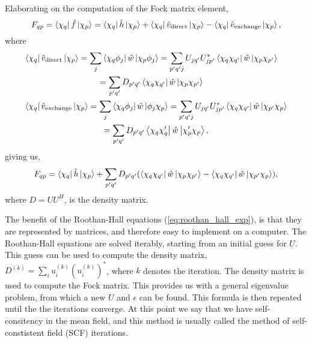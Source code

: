 Elaborating on the computation of the Fock matrix element,
\begin{equation}
    F_{qp} = \bra{\chi_q} \hat{f} \ket{\chi_p}
        = \bra{\chi_q} \hat{h} \ket{\chi_p} 
        + \bra{\chi_q} \hat{v}_{\text{direct}} \ket{\chi_p}
        - \bra{\chi_q} \hat{v}_{\text{exchange}} \ket{\chi_p},
\end{equation}
where
\begin{align}
    &\begin{gathered}
    \bra{\chi_q} \hat{v}_{\text{direct}} \ket{\chi_p}
        = \sum_j \bra{\chi_q \phi_j} \hat{w} \ket{\chi_p \phi_j} 
        = \sum_{p'q'j} U_{jq'} U^*_{jp'} 
            \bra{\chi_q \chi_{q'}} \hat{w} \ket{\chi_p \chi_{p'}} \\
        = \sum_{p'q'} D_{p'q'} \bra{\chi_q \chi_{q'}} \hat{w} \ket{\chi_p \chi_{p'}}
    \end{gathered} \\
    &\begin{gathered}
    \bra{\chi_q} \hat{v}_{\text{exchange}} \ket{\chi_p}
        = \sum_j \bra{\chi_q \phi_j} \hat{w} \ket{\phi_j \chi_p} 
        = \sum_{p'q'j} U_{jq'} U^*_{jp'} 
            \bra{\chi_q \chi_{q'}} \hat{w} \ket{\chi_{p'} \chi_p} \\
        = \sum_{p'q'} D_{p'q'} \bra{\chi_q \chi_q'} \hat{w} \ket{\chi_p' \chi_p},  
    \end{gathered}
\end{align}
giving us,
\begin{equation}
    F_{qp} = \bra{\chi_q}\hat{h} \ket{\chi_p} 
        + \sum_{p'q'}D_{p'q'}(
            \bra{\chi_q\chi_{q'}}\hat{w} \ket{\chi_p\chi_{p'}}
            - \bra{\chi_q\chi_{q'}}\hat{w} \ket{\chi_{p'}\chi_p}
        ),
\end{equation}
where $D = UU^H$, is the density matrix.

The benefit of the Roothan-Hall equations (\autoref{eq:roothan_hall_exp}), is that they 
are represented by matrices, and therefore easy to implement on a computer. The
Roothan-Hall equations are solved iterably, starting from an initial guess for $U$. 
This guess can be used to compute the density matrix, 
$D^(k) = \sum_i u_i^{(k)}(u_i^{(k)})^*$, where $k$ denotes the iteration. The density 
matrix is used to compute the Fock matrix. This provides us with a general eigenvalue 
problem, from which a new $U$ and $\epsilon$ can be found. This formula is then repeated
until the the iterations converge. At this point we say that we have self-consitency 
in the mean field, and this method is usually called the method of self-constistent
field (SCF) iterations.

